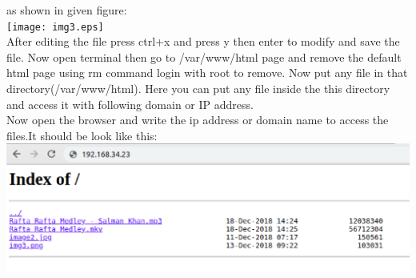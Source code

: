 \documentclass[journal,12pt,onecolumn]{IEEEtran}
\begin{document}
\begin{flushleft}
\begin{enumerate}
\begin{lstlisting}[frame=single,linewidth=15cm,breaklines=true]
\end{lstlisting}
\bigskip
as shown in given figure:\\
\texttt{[image: img3.eps]} \\
\bigskip
After editing the file press ctrl+x and press y then enter to modify and save the file. 
Now open terminal then go to /var/www/html page and remove the default html page using rm command login with root to remove.
Now put any file in that directory(/var/www/html). Here you can put any file inside the this directory and access it with following domain or IP address.\\
\medskip
Now open the browser and write the ip address or domain name to access the files.It should be look like this:\\
\medskip
\includegraphics[scale=.5]{img7.eps} \\
\bigskip


\end{enumerate}
\end{flushleft}
\end{document}
